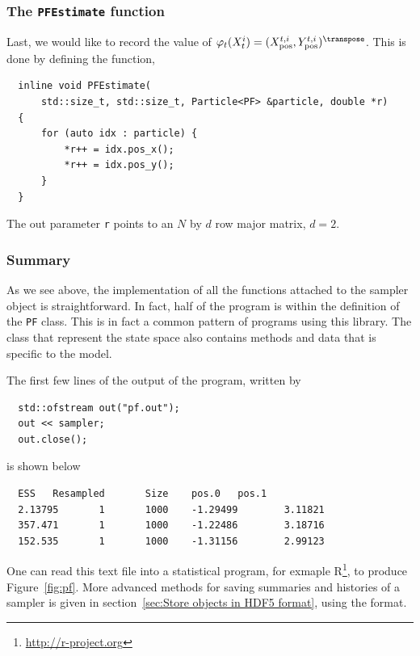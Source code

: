 \subsubsection{The \texttt{PFEstimate} function}

Last, we would like to record the value of $\varphi_t(X_t^i) =
(\xpos^{t,i},\ypos^{t,i})^{\transpose}$. This is done by defining the function,
\begin{Verbatim}
  inline void PFEstimate(
      std::size_t, std::size_t, Particle<PF> &particle, double *r)
  {
      for (auto idx : particle) {
          *r++ = idx.pos_x();
          *r++ = idx.pos_y();
      }
  }
\end{Verbatim}
The out parameter \verb|r| points to an $N$ by $d$ row major matrix, $d = 2$.

\subsubsection{Summary}

As we see above, the implementation of all the functions attached to the
sampler object is straightforward. In fact, half of the program is within the
definition of the \verb|PF| class. This is in fact a common pattern of programs
using this library. The class that represent the state space also contains
methods and data that is specific to the model.

The first few lines of the output of the program, written by
\begin{Verbatim}
  std::ofstream out("pf.out");
  out << sampler;
  out.close();
\end{Verbatim}
is shown below
\begin{Verbatim}
  ESS   Resampled       Size    pos.0   pos.1
  2.13795       1       1000    -1.29499        3.11821
  357.471       1       1000    -1.22486        3.18716
  152.535       1       1000    -1.31156        2.99123
\end{Verbatim}
One can read this text file into a statistical program, for exmaple
R\footnote{\url{http://r-project.org}}, to produce Figure~\ref{fig:pf}. More
advanced methods for saving summaries and histories of a sampler is given in
section~\ref{sec:Store objects in HDF5 format}, using the \hdf format.

